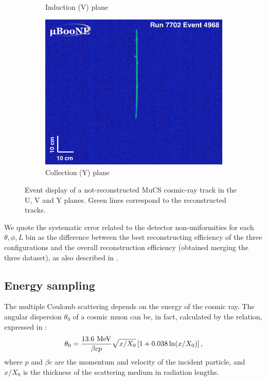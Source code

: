 \documentclass[a4paper]{scrartcl}
\begin{document}
\begin{figure}[htbp]
\begin{center}
\begin{subfigure}{0.3\textwidth}
      \caption{Induction (V) plane} \label{fig:v}
    \end{subfigure}
    \begin{subfigure}{0.3\textwidth}
      \includegraphics[width=\linewidth]{figures/y.png}
      \caption{Collection (Y) plane} \label{fig:y}
    \end{subfigure}    \caption{Event display of a not-reconstructed MuCS cosmic-ray track in the U, V and Y planes. Green lines correspond to the reconstructed tracks.} \label{fig:example}
  \end{center}
\end{figure}



We quote the systematic error related to the detector non-uniformities for each $\theta,\phi,L$ bin as the difference between the best reconstructing efficiency of the three configurations and the overall reconstruction efficiency (obtained merging the three dataset), as also described in \cite{besiii}.

\subsection{Energy sampling}
The multiple Coulomb scattering depends on the energy of the cosmic ray. The angular dispersion $\theta_{0}$ of a cosmic muon can be, in fact, calculated by the relation, expressed in \cite{pdg}:
\begin{equation}
\theta_{0} = \frac{13.6~\mathrm{MeV}}{\beta c p}\sqrt{x/X_{0}}\left[1+0.038\thinspace\mathrm{ln}(x/X_0)\right],
\end{equation}
where $p$ and $\beta c$ are the momentum and velocity of the incident particle, and $x/X_0$ is the thickness of the scattering medium in radiation lengths.
\end{document}
